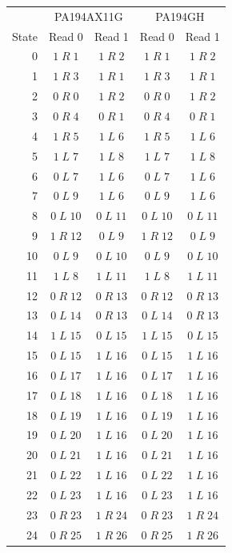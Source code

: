\begingroup\small
\begin{longtable}{rcccc}
\toprule & \multicolumn{2}{c}{PA194AX11G} & \multicolumn{2}{c}{PA194GH}\\
State & Read 0 & Read 1 & Read 0 & Read 1\\\midrule\endhead
0 & $1\;R\;1$ & $1\;R\;2$ & $1\;R\;1$ & $1\;R\;2$\\
1 & $1\;R\;3$ & $1\;R\;1$ & $1\;R\;3$ & $1\;R\;1$\\
2 & $0\;R\;0$ & $1\;R\;2$ & $0\;R\;0$ & $1\;R\;2$\\
3 & $0\;R\;4$ & $0\;R\;1$ & $0\;R\;4$ & $0\;R\;1$\\
4 & $1\;R\;5$ & $1\;L\;6$ & $1\;R\;5$ & $1\;L\;6$\\
5 & $1\;L\;7$ & $1\;L\;8$ & $1\;L\;7$ & $1\;L\;8$\\
6 & $0\;L\;7$ & $1\;L\;6$ & $0\;L\;7$ & $1\;L\;6$\\
7 & $0\;L\;9$ & $1\;L\;6$ & $0\;L\;9$ & $1\;L\;6$\\
8 & $0\;L\;10$ & $0\;L\;11$ & $0\;L\;10$ & $0\;L\;11$\\
9 & $1\;R\;12$ & $0\;L\;9$ & $1\;R\;12$ & $0\;L\;9$\\
10 & $0\;L\;9$ & $0\;L\;10$ & $0\;L\;9$ & $0\;L\;10$\\
11 & $1\;L\;8$ & $1\;L\;11$ & $1\;L\;8$ & $1\;L\;11$\\
12 & $0\;R\;12$ & $0\;R\;13$ & $0\;R\;12$ & $0\;R\;13$\\
13 & $0\;L\;14$ & $0\;R\;13$ & $0\;L\;14$ & $0\;R\;13$\\
14 & $1\;L\;15$ & $0\;L\;15$ & $1\;L\;15$ & $0\;L\;15$\\
15 & $0\;L\;15$ & $1\;L\;16$ & $0\;L\;15$ & $1\;L\;16$\\
16 & $0\;L\;17$ & $1\;L\;16$ & $0\;L\;17$ & $1\;L\;16$\\
17 & $0\;L\;18$ & $1\;L\;16$ & $0\;L\;18$ & $1\;L\;16$\\
18 & $0\;L\;19$ & $1\;L\;16$ & $0\;L\;19$ & $1\;L\;16$\\
19 & $0\;L\;20$ & $1\;L\;16$ & $0\;L\;20$ & $1\;L\;16$\\
20 & $0\;L\;21$ & $1\;L\;16$ & $0\;L\;21$ & $1\;L\;16$\\
21 & $0\;L\;22$ & $1\;L\;16$ & $0\;L\;22$ & $1\;L\;16$\\
22 & $0\;L\;23$ & $1\;L\;16$ & $0\;L\;23$ & $1\;L\;16$\\
23 & $0\;R\;23$ & $1\;R\;24$ & $0\;R\;23$ & $1\;R\;24$\\
24 & $0\;R\;25$ & $1\;R\;26$ & $0\;R\;25$ & $1\;R\;26$\\

\end{longtable}
